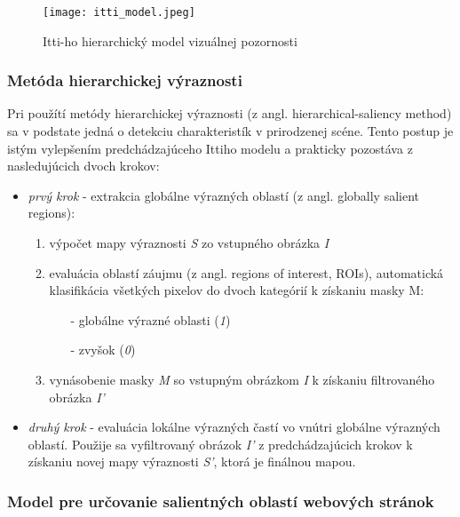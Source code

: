 \begin{figure}[H]
	\begin{center}
		\texttt{[image: itti\_model.jpeg]}
	\end{center}
	\caption[Itti-ho hierarchický model vizuálnej pozornosti]{Itti-ho hierarchický model vizuálnej pozornosti\cite{itti}\label{itti_image}}
\end{figure}

\subsubsection{Metóda hierarchickej výraznosti}

Pri použítí metódy hierarchickej výraznosti (z angl. hierarchical-saliency method\cite{gao2013hierarchical}) sa v podstate jedná o detekciu charakteristík v prirodzenej scéne. Tento postup je istým vylepšením predchádzajúceho Ittiho modelu a prakticky pozostáva z nasledujúcich dvoch krokov:

\begin{itemize}
	\item \textit{prvý krok} - extrakcia globálne výrazných oblastí (z angl. globally salient
	regions):
		\begin{enumerate}
			\item výpočet mapy výraznosti \textit{S} zo vstupného obrázka \textit{I}
			\item evaluácia oblastí záujmu (z angl. regions of interest, ROIs), automatická
			klasifikácia všetkých pixelov do dvoch kategórií k získaniu masky M:
			\begin{itemize}
				\item[-] globálne výrazné oblasti (\textit{1})
				\item[-] zvyšok (\textit{0})
			\end{itemize}
			\item vynásobenie masky \textit{M} so vstupným obrázkom \textit{I} k získaniu filtrovaného
			obrázka \textit{I'}
		\end{enumerate}
	\item \textit{druhý krok} - evaluácia lokálne výrazných častí vo vnútri globálne výrazných
	oblastí. Použije sa vyfiltrovaný obrázok \textit{I'} z predchádzajúcich krokov k získaniu novej mapy výraznosti \textit{S'}, ktorá je finálnou mapou.
\end{itemize}
	
\subsubsection{Model pre určovanie salientných oblastí webových stránok}

